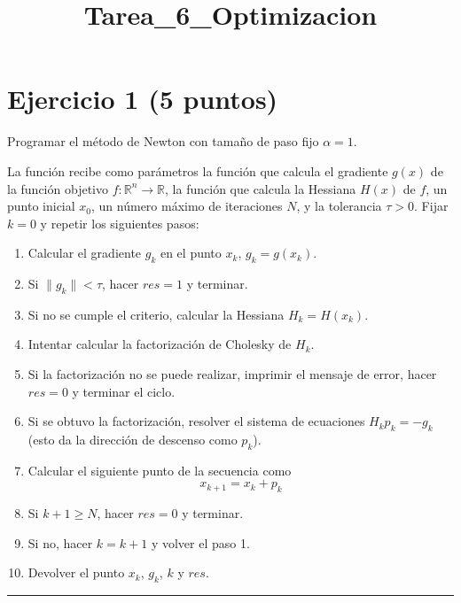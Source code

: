 \documentclass[11pt]{article}
\title{Tarea\_6\_Optimizacion}
\providecommand{\tightlist}{%
      \setlength{\itemsep}{0pt}\setlength{\parskip}{0pt}}
\begin{document}
    
    \maketitle
    
    

    
    \hypertarget{ejercicio-1-5-puntos}{%
\section{Ejercicio 1 (5 puntos)}\label{ejercicio-1-5-puntos}}

Programar el método de Newton con tamaño de paso fijo \(\alpha=1\).

La función recibe como parámetros la función que calcula el gradiente
\(g(x)\) de la función objetivo
\(f: \mathbb{R}^n \rightarrow \mathbb{R}\), la función que calcula la
Hessiana \(H(x)\) de \(f\), un punto inicial \(x_0\), un número máximo
de iteraciones \(N\), y la tolerancia \(\tau>0\). Fijar \(k=0\) y
repetir los siguientes pasos:

\begin{enumerate}
\def\labelenumi{\arabic{enumi}.}
\tightlist
\item
  Calcular el gradiente \(g_k\) en el punto \(x_k\), \(g_k = g(x_k)\).
\item
  Si \(\|g_k\| < \tau\), hacer \(res=1\) y terminar.
\item
  Si no se cumple el criterio, calcular la Hessiana \(H_k = H(x_k)\).
\item
  Intentar calcular la factorización de Cholesky de \(H_k\).
\item
  Si la factorización no se puede realizar, imprimir el mensaje de
  error, hacer \(res=0\) y terminar el ciclo.
\item
  Si se obtuvo la factorización, resolver el sistema de ecuaciones
  \(H_k p_k = -g_k\) (esto da la dirección de descenso como \(p_k\)).
\item
  Calcular el siguiente punto de la secuencia como
  \[x_{k+1} = x_k + p_k \]
\item
  Si \(k+1\geq N\), hacer \(res=0\) y terminar.
\item
  Si no, hacer \(k = k+1\) y volver el paso 1.
\item
  Devolver el punto \(x_k\), \(g_k\), \(k\) y \(res\).
\end{enumerate}

\begin{center}\rule{0.5\linewidth}{0.5pt}\end{center}
\end{document}
